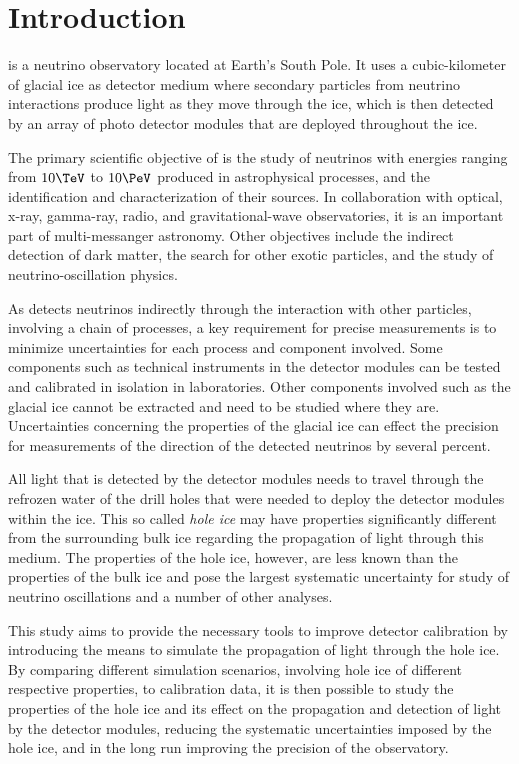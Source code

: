 
\section{Introduction}
\label{sec:intro}

\icecube is a neutrino observatory located at Earth's South Pole.
It uses a cubic-kilometer of glacial ice as detector medium where secondary particles from neutrino interactions produce light as they move through the ice, which is then detected by an array of photo detector modules that are deployed throughout the ice. \cite{evidence2013}

The primary scientific objective of \icecube is the study of neutrinos with energies ranging from $10\TeV$ to $10\PeV$ produced in astrophysical processes, and the identification and characterization of their sources. In collaboration with optical, x-ray, gamma-ray, radio, and gravitational-wave observatories, it is an important part of multi-messanger astronomy. Other objectives include the indirect detection of dark matter, the search for other exotic particles, and the study of neutrino-oscillation physics. \cite{instrumentation, evidence2013}

As \icecube detects neutrinos indirectly through the interaction with other particles, involving a chain of processes, a key requirement for precise measurements is to minimize uncertainties for each process and component involved. Some components such as technical instruments in the detector modules can be tested and calibrated in isolation in laboratories. Other components involved such as the glacial ice cannot be extracted and need to be studied where they are. Uncertainties concerning the properties of the glacial ice can effect the precision for measurements of the direction of the detected neutrinos by several percent. \cite{wrede}

All light that is detected by the detector modules needs to travel through the refrozen water of the drill holes that were needed to deploy the detector modules within the ice. This so called \textit{hole ice} may have properties significantly different from the surrounding bulk ice regarding the propagation of light through this medium. The properties of the hole ice, however, are less known than the properties of the bulk ice and pose the largest systematic uncertainty for study of neutrino oscillations and a number of other analyses. \cite{icrc17pocam}

This study aims to provide the necessary tools to improve detector calibration by introducing the means to simulate the propagation of light through the hole ice. By comparing different simulation scenarios, involving hole ice of different respective properties, to calibration data, it is then possible to study the properties of the hole ice and its effect on the propagation and detection of light by the detector modules, reducing the systematic uncertainties imposed by the hole ice, and in the long run improving the precision of the \icecube observatory.

